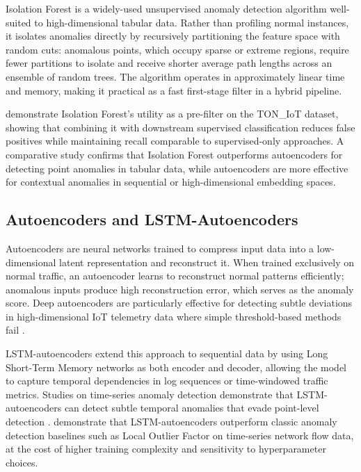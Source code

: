 \documentclass[12pt,a4paper]{report}
\begin{document}
Isolation Forest \citep{liu2008} is a widely-used unsupervised anomaly detection algorithm well-suited to high-dimensional tabular data. Rather than profiling normal instances, it isolates anomalies directly by recursively partitioning the feature space with random cuts: anomalous points, which occupy sparse or extreme regions, require fewer partitions to isolate and receive shorter average path lengths across an ensemble of random trees. The algorithm operates in approximately linear time and memory, making it practical as a fast first-stage filter in a hybrid pipeline.

\citet{alsaedi2020} demonstrate Isolation Forest's utility as a pre-filter on the TON\_IoT dataset, showing that combining it with downstream supervised classification reduces false positives while maintaining recall comparable to supervised-only approaches. A comparative study \citep{nassif2021} confirms that Isolation Forest outperforms autoencoders for detecting point anomalies in tabular data, while autoencoders are more effective for contextual anomalies in sequential or high-dimensional embedding spaces.

\subsection{Autoencoders and LSTM-Autoencoders}
\label{sec:autoencoders}

Autoencoders are neural networks trained to compress input data into a low-dimensional latent representation and reconstruct it. When trained exclusively on normal traffic, an autoencoder learns to reconstruct normal patterns efficiently; anomalous inputs produce high reconstruction error, which serves as the anomaly score. Deep autoencoders are particularly effective for detecting subtle deviations in high-dimensional IoT telemetry data where simple threshold-based methods fail \citep{moustafa2021}.

LSTM-autoencoders extend this approach to sequential data by using Long Short-Term Memory networks as both encoder and decoder, allowing the model to capture temporal dependencies in log sequences or time-windowed traffic metrics. Studies on time-series anomaly detection demonstrate that LSTM-autoencoders can detect subtle temporal anomalies that evade point-level detection \citep{malhotra2016}. \citet{park2023} demonstrate that LSTM-autoencoders outperform classic anomaly detection baselines such as Local Outlier Factor on time-series network flow data, at the cost of higher training complexity and sensitivity to hyperparameter choices.
\end{document}
